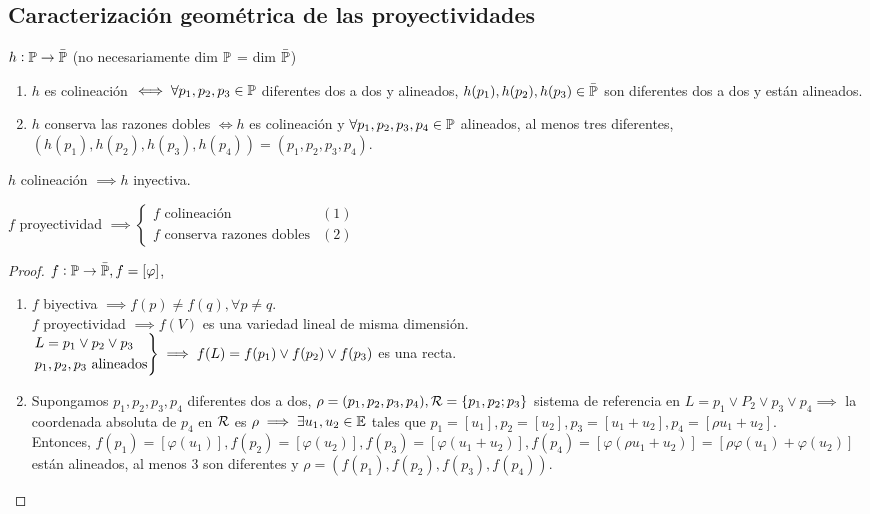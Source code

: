 \subsection{Caracterización geométrica de las proyectividades}

\begin{defi}
	$h : \mathbb{P} \to \bar{\mathbb{P}}$ (no necesariamente dim $\mathbb{P}$ = dim $\bar{\mathbb{P}}$)
	\begin{enumerate}
		\item $h$ es colineación $\iff \forall p_1, p_2, p_3 \in \mathbb{P}$ diferentes dos a dos y alineados, $h(p_1), h(p_2), h(p_3) \in \bar{\mathbb{P}}$ son diferentes dos a dos y están alineados.
		\item $h$ conserva las razones dobles $\iff h$ es colineación y $\forall p_1, p_2, p_3, p_4 \in \mathbb{P}$ alineados, al menos tres diferentes, $(h(p_1), h(p_2), h(p_3), h(p_4)) = (p_1, p_2, p_3, p_4)$.
	\end{enumerate}
\end{defi}
\begin{obs}
	$h$ colineación $\implies h$ inyectiva.
\end{obs}
\begin{prop}
	$f$ proyectividad $\implies \begin{cases} f \text{ colineación} & (1) \label{coli} \\ f \text{ conserva razones dobles} & (2) \label{cons_raz_dob} \end{cases}$
\end{prop}
\begin{proof}
	$f : \mathbb{P} \to \bar{\mathbb{P}}, f = [\varphi]$,
	\begin{enumerate}[(1)]
		\item $f$ biyectiva $\implies f(p) \neq f(q), \forall p \neq q$. \\
		$f$ proyectividad $\implies f(V)$ es una variedad lineal de misma dimensión. \\
		$\begin{rcases}
		L = p_1 \vee p_2 \vee p_3 \\
		p_1, p_2, p_3 \text{ alineados}
		\end{rcases}
		\implies f(L) = f(p_1) \vee f(p_2) \vee f(p_3)$ es una recta.
		\item Supongamos $p_1, p_2, p_3, p_4$ diferentes dos a dos, $\rho = (p_1, p_2, p_3, p_4), \mathcal{R} = \{p_1, p_2; p_3\}$ sistema de referencia en $L = p_1 \vee P_2 \vee p_3 \vee p_4 \implies$ la coordenada absoluta de $p_4$ en $\mathcal{R}$ es $\rho \implies \exists u_1, u_2 \in \mathbb{E}$ tales que $p_1 = [u_1], p_2 = [u_2], p_3 = [u_1 + u_2], p_4 = [\rho u_1 + u_2]$. \\
		Entonces, $f(p_1) = [\varphi(u_1)], f(p_2) = [\varphi(u_2)], f(p_3) = [\varphi(u_1 + u_2)], f(p_4) = [\varphi(\rho u_1 + u_2)] = [\rho \varphi(u_1) + \varphi(u_2)]$ están alineados, al menos 3 son diferentes y $\rho = (f(p_1), f(p_2), f(p_3), f(p_4))$.
	\end{enumerate}
\end{proof}


